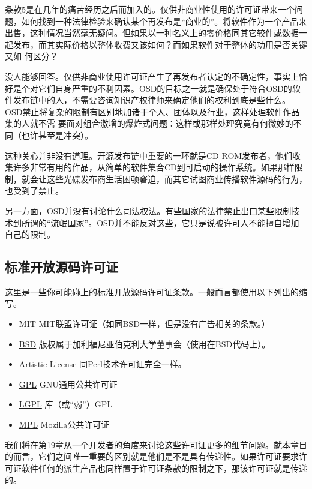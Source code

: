 \documentclass[12pt,oneside]{book}
\begin{document}
条款5是在几年的痛苦经历之后而加入的。仅供非商业性使用的许可证带来一个问题，如何找到一种法律检验来确认某个再发布是“商业的”。将软件作为一个产品来出售，这种情况当然毫无疑问。但如果以一种名义上的零价格同其它较件或数据一起发布，而其实际价格以整体收费又该如何？而如果软件对于整体的功用是否关键又如
何区分？

没人能够回答。仅供非商业使用许可证产生了再发布者认定的不确定性，事实上恰好是个对它们自身严重的不利因素。OSD的目标之一就是确保处于符合OSD的软件发布链中的人，不需要咨询知识产权律师来确定他们的权利到底是些什么。OSD禁止将复杂的限制有区别地加诸于个人、团体以及行业，这样处理软件作品集的人就不需
要面对组合激增的爆炸式问题：这样或那样处理究竟有何微妙的不同（也许甚至是冲突）。

这种关心并非没有道理。开源发布链中重要的一环就是CD-ROM发布者，他们收集许多非常有用的作品，从简单的软件集合CD到可启动的操作系统。如果那样限制，就会让这些光碟发布商生活困顿窘迫，而其它试图商业传播软件源码的行为，也受到了禁止。

另一方面，OSD并没有讨论什么司法权法。有些国家的法律禁止出口某些限制技术到所谓的“流氓国家”。OSD并不能反对这些，它只是说被许可人不能擅自增加自己的限制。

\subsection{标准开放源码许可证}
这里是一些你可能碰上的标准开放源码许可证条款。一般而言都使用以下列出的缩写。
\begin{itemize}
\item \href{http://www.opensource.org/licenses/mit-license.html}{MIT} MIT联盟许可证（如同BSD一样，但是没有广告相关的条款。）
\item \href{http://www.opensource.org/licenses/bsd-license.html}{BSD} 版权属于加利福尼亚伯克利大学董事会（使用在BSD代码上）。
\item \href{http://www.opensource.org/licenses/artistic-license.html}{Artistic License} 同Perl技术许可证完全一样。
\item \href{http://www.gnu.org/copyleft.html}{GPL} GNU通用公共许可证
\item \href{http://www.gnu.org/copyleft.html}{LGPL} 库（或“弱”）GPL
\item \href{http://www.opensource.org/licenses/MPL-1.1.html}{MPL} Mozilla公共许可证
\end{itemize}

我们将在第19章从一个开发者的角度来讨论这些许可证更多的细节问题。就本章目的而言，它们之间唯一重要的区别就是他们是不是具有传递性。如果许可证要求许可证软件任何的派生产品也同样置于许可证条款的限制之下，那该许可证就是传递的。
\end{document}
